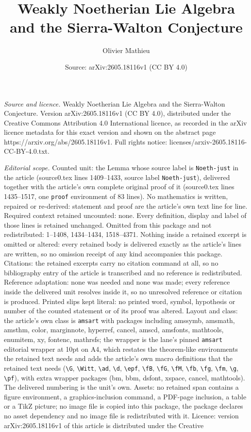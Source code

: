 \documentclass[10pt,a4paper]{amsart}
\title[Weakly Noetherian Lie Algebra and the Sierra-Walton Conjectu]{Weakly Noetherian Lie Algebra and the Sierra-Walton Conjecture}
\author{Olivier Mathieu}
\date{Source: arXiv:2605.18116v1 (CC BY 4.0)}
\begin{document}
\maketitle

\noindent\emph{Source and licence.} Weakly Noetherian Lie Algebra and the Sierra-Walton Conjecture. Version arXiv:2605.18116v1 (CC BY 4.0), distributed under the Creative Commons Attribution 4.0 International licence, as recorded in the arXiv licence metadata for this exact version and shown on the abstract page https://arxiv.org/abs/2605.18116v1. Full rights notice: licenses/arxiv-2605.18116-CC-BY-4.0.txt.\par\smallskip

\noindent\textit{Editorial scope.} Counted unit: the Lemma whose source label is \texttt{Noeth-just} in the article (source0.tex lines 1409--1433, source label \texttt{Noeth-just}), delivered together with the article's own complete original proof of it (source0.tex lines 1435--1517, one \texttt{proof} environment of 83 lines). No mathematics is written, repaired or re-derived: statement and proof are the article's own text line for line. Required context retained uncounted: none. Every definition, display and label of those lines is retained unchanged. Omitted from this package and not redistributed: 1--1408, 1434--1434, 1518--4371. Nothing inside a retained excerpt is omitted or altered: every retained body is delivered exactly as the article's lines are written, so no omission receipt of any kind accompanies this package. Citations: the retained excerpts carry no citation command at all, so no bibliography entry of the article is transcribed and no reference is redistributed. Reference adaptation: none was needed and none was made; every reference inside the delivered unit resolves inside it, so no unresolved reference or citation is produced. Printed slips kept literal: no printed word, symbol, hypothesis or number of the counted statement or of its proof was altered. Layout and class: the article's own class is \texttt{amsart} with packages including amssymb, amsmath, amsthm, color, marginnote, hyperref, cancel, amscd, amsfonts, mathtools, enumitem, xy, fontenc, mathrsfs; the wrapper is the lane's pinned \texttt{amsart} editorial wrapper at 10pt on A4, which restates the theorem-like environments the retained text needs and adds the article's own macro definitions that the retained text needs (\texttt{\textbackslash G}, \texttt{\textbackslash Witt}, \texttt{\textbackslash ad}, \texttt{\textbackslash d}, \texttt{\textbackslash epf}, \texttt{\textbackslash fB}, \texttt{\textbackslash fG}, \texttt{\textbackslash fM}, \texttt{\textbackslash fb}, \texttt{\textbackslash fg}, \texttt{\textbackslash fm}, \texttt{\textbackslash g}, \texttt{\textbackslash pf}), with extra wrapper packages (bm, bbm, dsfont, xspace, cancel, mathtools). The delivered numbering is the unit's own. Assets: no retained span contains a figure environment, a graphics-inclusion command, a PDF-page inclusion, a table or a TikZ picture; no image file is copied into this package, the package declares no asset dependency and no image file is redistributed with it. Licence: version arXiv:2605.18116v1 of this article is distributed under the Creative 
\end{document}
